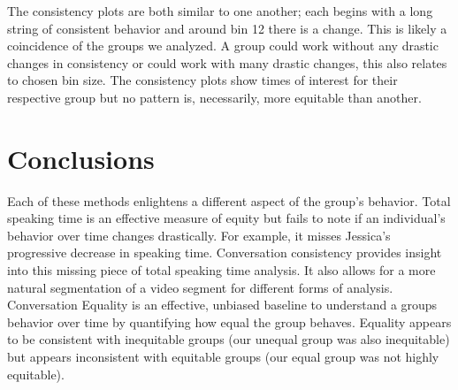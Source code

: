 \documentclass[aps,pra,reprint,noshowpacs,superscriptaddress, nofootinbib]{revtex4-1}
\begin{document}
The consistency plots are both similar to one another; each begins with a long string of consistent behavior and around bin 12 there is a change. This is likely a coincidence of the groups we analyzed. A group could work without any drastic changes in consistency or could work with many drastic changes, this also relates to chosen bin size. The consistency plots show times of interest for their respective group but no pattern is, necessarily, more equitable than another.
% 
% 

\section{Conclusions}
   Each of these methods enlightens a different aspect of the group's behavior. Total speaking time is an effective measure of equity but fails to note if an individual's behavior over time changes drastically. For example, it misses Jessica's progressive decrease in speaking time. Conversation consistency provides insight into this missing piece of total speaking time analysis. It also allows for a more natural segmentation of a video segment for different forms of analysis. Conversation Equality is an effective, unbiased baseline to understand a groups behavior over time by quantifying how equal the group behaves. Equality appears to be consistent with inequitable groups (our unequal group was also inequitable) but appears inconsistent with equitable groups (our equal group was not highly equitable).
   
% 
% 
   
% 
% 
   
\end{document}
